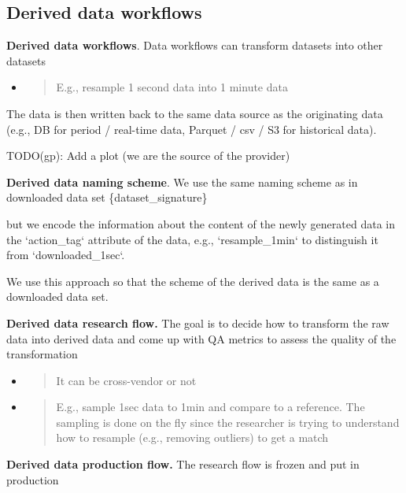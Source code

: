 \documentclass[11pt, reqno]{amsart}
\begin{document}
\subsection{Derived data workflows}

\textbf{Derived data workflows}. Data workflows can transform datasets
into other datasets

\begin{itemize}
\item
  \begin{quote}
  E.g., resample 1 second data into 1 minute data
  \end{quote}
\end{itemize}

The data is then written back to the same data source as the originating
data (e.g., DB for period / real-time data, Parquet / csv / S3 for
historical data).

TODO(gp): Add a plot (we are the source of the provider)

\textbf{Derived data naming scheme}. We use the same naming scheme as in
downloaded data set \{dataset\_signature\}

but we encode the information about the content of the newly generated
data in the `action\_tag` attribute of the data, e.g., `resample\_1min`
to distinguish it from `downloaded\_1sec`.

We use this approach so that the scheme of the derived data is the same
as a downloaded data set.

\textbf{Derived data research flow.} The goal is to decide how to
transform the raw data into derived data and come up with QA metrics to
assess the quality of the transformation

\begin{itemize}
\item
  \begin{quote}
  It can be cross-vendor or not
  \end{quote}
\item
  \begin{quote}
  E.g., sample 1sec data to 1min and compare to a reference. The
  sampling is done on the fly since the researcher is trying to
  understand how to resample (e.g., removing outliers) to get a match
  \end{quote}
\end{itemize}

\textbf{Derived data production flow.} The research flow is frozen and
put in production
\end{document}

